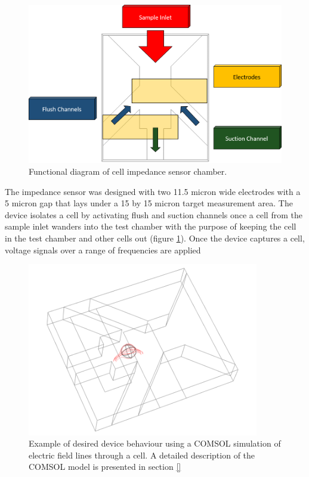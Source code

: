 \begin{figure}[h]
    \centering
    \includegraphics[width=\textwidth]{images/josh_steph_design.png}
    \caption{Functional diagram of cell impedance sensor chamber.}
    \label{fig:josh-steph_functional_diagram}
\end{figure}

\par The impedance sensor was designed with two 11.5 micron wide electrodes with a 5 micron gap that lays under a 15 by 15 micron target measurement area. The device isolates a cell by activating flush and suction channels once a cell from the sample inlet wanders into the test chamber with the purpose of keeping the cell in the test chamber and other cells out (figure \ref{fig:josh-steph_functional_diagram}). Once the device captures a cell, voltage signals over a range of frequencies are applied 

\begin{figure}[h]
    \centering
    \includegraphics[width=0.9\textwidth]{images/josh_steph_sim.png}
    \caption{Example of desired device behaviour using a COMSOL simulation of electric field lines through a cell. A detailed description of the COMSOL model is presented in section \ref{}}
    \label{fig:josh-steph_sim}
\end{figure}



